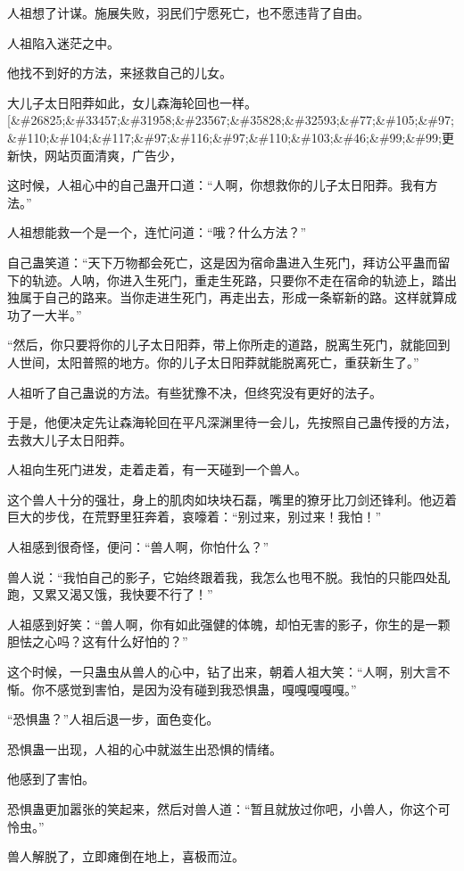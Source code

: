 \begin{this_body}
人祖想了计谋。施展失败，羽民们宁愿死亡，也不愿违背了自由。

人祖陷入迷茫之中。

他找不到好的方法，来拯救自己的儿女。

大儿子太日阳莽如此，女儿森海轮回也一样。[\&\#26825;\&\#33457;\&\#31958;\&\#23567;\&\#35828;\&\#32593;\&\#77;\&\#105;\&\#97;\&\#110;\&\#104;\&\#117;\&\#97;\&\#116;\&\#97;\&\#110;\&\#103;\&\#46;\&\#99;\&\#99;更新快，网站页面清爽，广告少，

这时候，人祖心中的自己蛊开口道：“人啊，你想救你的儿子太日阳莽。我有方法。”

人祖想能救一个是一个，连忙问道：“哦？什么方法？”

自己蛊笑道：“天下万物都会死亡，这是因为宿命蛊进入生死门，拜访公平蛊而留下的轨迹。人呐，你进入生死门，重走生死路，只要你不走在宿命的轨迹上，踏出独属于自己的路来。当你走进生死门，再走出去，形成一条崭新的路。这样就算成功了一大半。”

“然后，你只要将你的儿子太日阳莽，带上你所走的道路，脱离生死门，就能回到人世间，太阳普照的地方。你的儿子太日阳莽就能脱离死亡，重获新生了。”

人祖听了自己蛊说的方法。有些犹豫不决，但终究没有更好的法子。

于是，他便决定先让森海轮回在平凡深渊里待一会儿，先按照自己蛊传授的方法，去救大儿子太日阳莽。

人祖向生死门进发，走着走着，有一天碰到一个兽人。

这个兽人十分的强壮，身上的肌肉如块块石磊，嘴里的獠牙比刀剑还锋利。他迈着巨大的步伐，在荒野里狂奔着，哀嚎着：“别过来，别过来！我怕！”

人祖感到很奇怪，便问：“兽人啊，你怕什么？”

兽人说：“我怕自己的影子，它始终跟着我，我怎么也甩不脱。我怕的只能四处乱跑，又累又渴又饿，我快要不行了！”

人祖感到好笑：“兽人啊，你有如此强健的体魄，却怕无害的影子，你生的是一颗胆怯之心吗？这有什么好怕的？”

这个时候，一只蛊虫从兽人的心中，钻了出来，朝着人祖大笑：“人啊，别大言不惭。你不感觉到害怕，是因为没有碰到我恐惧蛊，嘎嘎嘎嘎嘎。”

“恐惧蛊？”人祖后退一步，面色变化。

恐惧蛊一出现，人祖的心中就滋生出恐惧的情绪。

他感到了害怕。

恐惧蛊更加嚣张的笑起来，然后对兽人道：“暂且就放过你吧，小兽人，你这个可怜虫。”

兽人解脱了，立即瘫倒在地上，喜极而泣。


\end{this_body}
